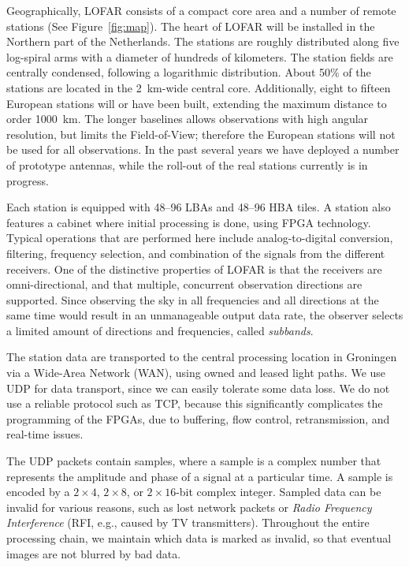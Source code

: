 \documentclass{sig-alternate}
\begin{document}
Geographically, LOFAR consists of a compact core area and a number of
remote stations (See Figure~\ref{fig:map}).  The heart of LOFAR will
be installed in the Northern part of the Netherlands.  The stations
are roughly distributed along five log-spiral arms with a diameter of
hundreds of kilometers. 
The station fields are centrally condensed,
following a logarithmic distribution.  About 50\% of the stations are
located in the 2~km-wide central core.
Additionally, eight to fifteen European stations will or have been built,
extending the maximum distance to order 1000~km.
The longer baselines allows observations with high angular resolution,
but limits the Field-of-View; therefore the European stations will not be
used for all observations.
In the past several years we have deployed a number of prototype antennas,
while the roll-out of the real stations currently is in progress.

Each station is equipped with 48--96 LBAs and 48--96 HBA tiles. 
A station also features a cabinet where initial processing is done, using
FPGA technology.
Typical operations that are performed here include analog-to-digital
conversion, filtering, frequency selection, and combination of the signals
from the different receivers.
One of the distinctive properties of LOFAR is that the receivers are
omni-directional, and that multiple, concurrent observation directions are
supported.
Since observing the sky in all frequencies and all directions at the same time
would result in an unmanageable output data rate, the observer selects a
limited amount of directions and frequencies, called \emph{subbands}.

The station data are transported to the central processing location in
Groningen via a Wide-Area Network (WAN), using owned and leased light paths.
We use UDP for data transport, since we can easily tolerate some data loss.
We do not use a reliable protocol such as TCP, because this significantly
complicates the programming of the FPGAs, due to buffering, flow control,
retransmission, and real-time issues.

The UDP packets contain samples, where a sample is a complex number
that represents the amplitude and phase of a signal at a particular
time.  A sample is encoded by a $2\times4$, $2\times8$, or $2\times16$-bit
complex integer. Sampled data can be invalid for various reasons, such as
lost network packets or \emph{Radio Frequency Interference\/} (RFI, e.g.,
caused by TV transmitters).
Throughout the entire processing chain, we maintain which
data is marked as invalid, so that eventual images are not blurred by
bad data.  
\end{document}
